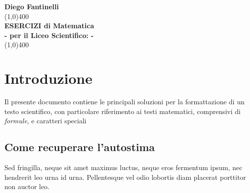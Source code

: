 \documentclass[11pt]{article}
\begin{document}
\begin{titlepage}
\begin{center}
\vspace*{1cm}

\Large{\textbf{Diego Fantinelli}}\\
\vfill
\line(1,0){400}\\[.5mm]
\huge{\textbf{ESERCIZI di Matematica}}\\[3mm]
\Large{\textbf{- per il Liceo Scientifico:  -}}\\[1mm]
\line(1,0){400}\\
\vfill


\end{center}
\end{titlepage}


\tableofcontents
\thispagestyle{empty}
\clearpage

\setcounter{page}{1}

\vspace*{1cm}
\section{Introduzione}
Il presente documento contiene le principali soluzioni per la formattazione di un testo scientifico, con particolare riferimento ai testi matematici, comprensivi di \emph{formule}, e caratteri speciali

\subsection{Come recuperare l'autostima}
Sed fringilla, neque sit amet maximus luctus, neque eros fermentum ipsum, nec hendrerit leo urna id urna. Pellentesque vel odio lobortis diam placerat porttitor non auctor leo.\\
\end{document}
